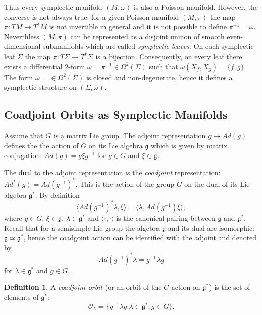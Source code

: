\documentclass[11pt]{report}
\theoremstyle{plain}
\theoremstyle{definition}
\newtheorem{defn}[thm]{Definition}
\theoremstyle{remark}
\theoremstyle{remark}
\numberwithin{equation}{section}
\begin{document}
 Thus every symplectic manifold $(M,\omega)$ is also a Poisson manifold. However, the converse is not always true: for a given Poisson manifold $(M,\pi)$ the map $\pi: TM \to T^*M$ is not invertible in general and it is not possible to define $\pi^{-1} = \omega$. 
 Neverthless $(M,\pi)$ can be represented as a disjoint uninon of smooth even-dimensional submanifolds which are called \textit{symplectic leaves}. On each symplectic leaf $\Sigma$ the map $\pi: T\Sigma \to T^*\Sigma$ is a bijection. Consequently, on every leaf there exists a differential 2-form $\omega = \pi^{-1}\in \Omega^2(\Sigma)$ such that $\omega(X_f, X_g) = \{ f, g \}$. The form $\omega = \in \Omega^2(\Sigma)$ is closed and non-degenerate, hence it defines a symplectic structure on $(\Sigma, \omega)$. 
 
 

 
 
 \subsection{Coadjoint Orbits as Symplectic Manifolds}
 
 Assume that $G$ is a matrix Lie group. The adjoint representation $g\mapsto Ad(g)$ defines the the action of $G$ on its Lie algebra $\mathfrak{g}$ which is given by matrix conjugation: $Ad(g) = g\xi g^{-1}$ for $g\in G$ and $\xi \in \mathfrak{g}$.
 
 The dual to the adjoint representation is the \textit{coadjoint} representation: $Ad^*(g) = Ad(g^{-1})^*$. This is the action of the group $G$ on the dual of its Lie algebra $\mathfrak{g}^*$. By definition
 \begin{equation}
 \langle Ad(g^{-1})^* \lambda, \xi \rangle = \langle \lambda, Ad(g^{-1})\xi \rangle,
 \end{equation} 
 where $g\in G$, $\xi \in \mathfrak{g}$, $\lambda \in \mathfrak{g}^*$ and $\langle \cdot , \cdot \rangle$ is the canonical pairing between $\mathfrak{g}$ and $\mathfrak{g}^*$. 
 Recall that for a semisimple Lie group the algebra $\mathfrak{g}$ and its dual are isomorphic: $\mathfrak{g} \simeq \mathfrak{g}^*$, hence the coadgoint action can be identified with the adjoint and denoted by 
 \begin{equation}
 Ad(g^{-1})^* \lambda = g^{-1}\lambda g
 \end{equation}
  for $\lambda \in \mathfrak{g}^*$ and $g \in G$. 
 
 \begin{defn}
 A \textit{coadjoint orbit} (or an orbit of the $G$ action on $\mathfrak{g}^*$) is the set of elements of $\mathfrak{g}^*$:
 \begin{equation}
 \mathcal{O}_\lambda = \{g^{-1}\lambda g| \lambda \in \mathfrak{g}^*, g \in G\}.
 \end{equation}
 \end{defn}
 
\end{document}
